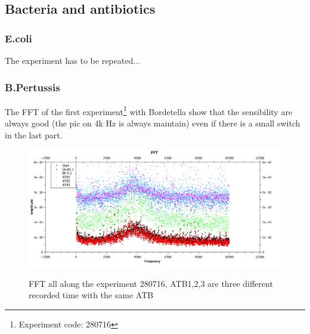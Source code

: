 \documentclass[11pt, a4paper]{article}
\begin{document}


  

\subsection{Bacteria and antibiotics}%
	\subsubsection{E.coli}%
    The experiment has to be repeated...
    
	\subsubsection{B.Pertussis}%
The FFT of the first experiment\footnote{Experiment code: 280716} with Bordetella
show that the sensibility are always good (the pic on 4k Hz is always maintain) even if there is a small switch in the last part. 
\begin{figure}[h]
\centering
\includegraphics[width=0.7\linewidth]{FFT/FFT_280716}
\label{fig:FFT_280716}
\caption{FFT all along the experiment 280716, ATB1,2,3 are three different recorded time with the same ATB}
\end{figure}
\end{document}
